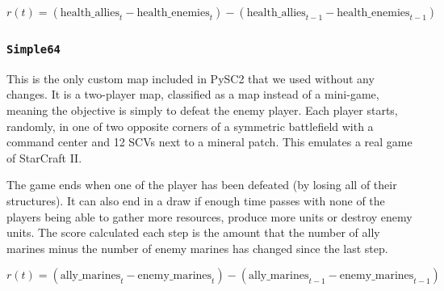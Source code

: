 $$
r(t) = (\text{health\_allies}_{t} - \text{health\_enemies}_{t}) - (\text{health\_allies}_{t-1} - \text{health\_enemies}_{t-1})
$$

\subsubsection*{\texttt{Simple64}}

This is the only custom map included in PySC2 that we used without any changes. It is a two-player map, classified as a  map instead of a mini-game, meaning the objective is simply to defeat the enemy player. Each player starts, randomly, in one of two opposite corners of a symmetric battlefield with a command center and 12 SCVs next to a mineral patch. This emulates a real game of StarCraft II.

The game ends when one of the player has been defeated (by losing all of their structures). It can also end in a draw if enough time passes with none of the players being able to gather more resources, produce more units or destroy enemy units. The score calculated each step is the amount that the number of ally marines minus the number of enemy marines has changed since the last step.

$$
r(t) = (\text{ally\_marines}_{t} - \text{enemy\_marines}_{t}) - (\text{ally\_marines}_{t-1} - \text{enemy\_marines}_{t-1})
$$
